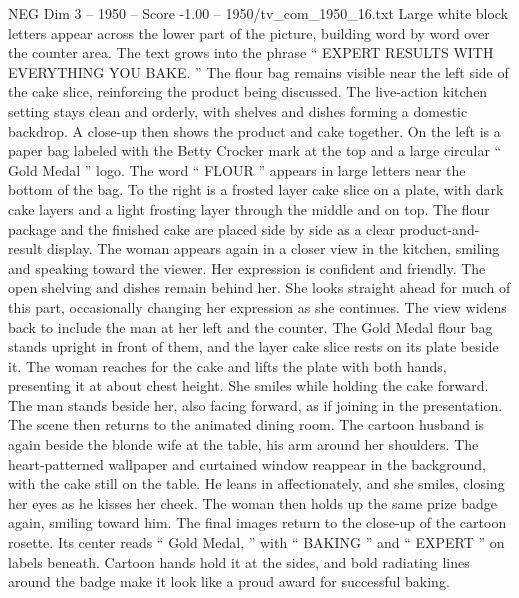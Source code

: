 \begin{textsample}{NEG Dim 3 – 1950 – Score -1.00 – 1950/tv\_com\_1950\_16.txt}
Large white block letters appear across the lower part of the picture, building word by word over the counter area.
The text grows into the phrase “ EXPERT RESULTS WITH EVERYTHING YOU BAKE. ” The flour bag remains visible near the left side of the cake slice, reinforcing the product being discussed.
The live-action kitchen setting stays clean and orderly, with shelves and dishes forming a domestic backdrop.
A close-up then shows the product and cake together.
On the left is a paper bag labeled with the Betty Crocker mark at the top and a large circular “ Gold Medal ” logo.
The word “ FLOUR ” appears in large letters near the bottom of the bag.
To the right is a frosted layer cake slice on a plate, with dark cake layers and a light frosting layer through the middle and on top.
The flour package and the finished cake are placed side by side as a clear product-and-result display.
The woman appears again in a closer view in the kitchen, smiling and speaking toward the viewer.
Her expression is confident and friendly.
The open shelving and dishes remain behind her.
She looks straight ahead for much of this part, occasionally changing her expression as she continues.
The view widens back to include the man at her left and the counter.
The Gold Medal flour bag stands upright in front of them, and the layer cake slice rests on its plate beside it.
The woman reaches for the cake and lifts the plate with both hands, presenting it at about chest height.
She smiles while holding the cake forward.
The man stands beside her, also facing forward, as if joining in the presentation.
The scene then returns to the animated dining room.
The cartoon husband is again beside the blonde wife at the table, his arm around her shoulders.
The heart-patterned wallpaper and curtained window reappear in the background, with the cake still on the table.
He leans in affectionately, and she smiles, closing her eyes as he kisses her cheek.
The woman then holds up the same prize badge again, smiling toward him.
The final images return to the close-up of the cartoon rosette.
Its center reads “ Gold Medal, ” with “ BAKING ” and “ EXPERT ” on labels beneath.
Cartoon hands hold it at the sides, and bold radiating lines around the badge make it look like a proud award for successful baking.

\end{textsample}
